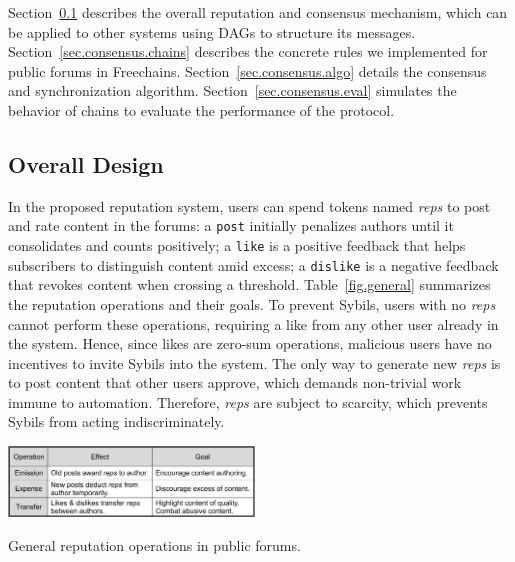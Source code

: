 \documentclass[10pt,journal,compsoc]{IEEEtran}
\newcommand{\FC}       {Freechains\xspace}
\newcommand{\reps}     {\emph{reps}\xspace}
\newcommand{\code}[1]  {\texttt{\footnotesize{#1}}}
\begin{document}
Section~\ref{sec.consensus.design} describes the overall reputation and
consensus mechanism, which can be applied to other systems using DAGs to
structure its messages.
Section~\ref{sec.consensus.chains} describes the concrete rules we implemented
for public forums in \FC.
Section~\ref{sec.consensus.algo} details the consensus and synchronization
algorithm.
Section~\ref{sec.consensus.eval} simulates the behavior of chains to evaluate
the performance of the protocol.

\subsection{Overall Design}
\label{sec.consensus.design}

In the proposed reputation system, users can spend tokens named \reps to post
and rate content in the forums:
a \code{post} initially penalizes authors until it consolidates and counts
positively;
a \code{like} is a positive feedback that helps subscribers to distinguish
content amid excess;
a \code{dislike} is a negative feedback that revokes content when crossing a
threshold.
Table~\ref{fig.general} summarizes the reputation operations and their goals.
To prevent Sybils, users with no \reps cannot perform these operations,
requiring a like from any other user already in the system.
Hence, since likes are zero-sum operations, malicious users have no incentives
to invite Sybils into the system.
The only way to generate new \reps is to post content that other users approve,
which demands non-trivial work immune to automation.
Therefore, \reps are subject to scarcity, which prevents Sybils from acting
indiscriminately.

\begin{table}
\centering
\includegraphics[width=0.49\textwidth]{general.png}
\caption{General reputation operations in public forums.}
\label{fig.general}
\end{table}
\end{document}
